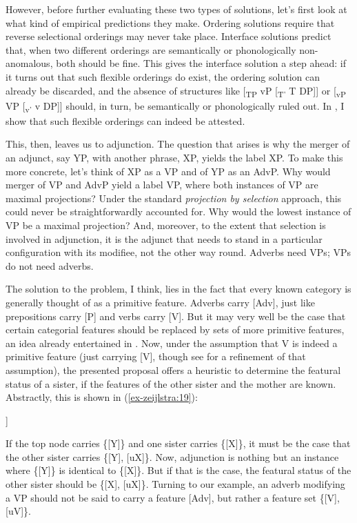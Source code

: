 \documentclass[output=paper
,modfonts
,nonflat]{langsci/langscibook}
\begin{document}
However, before further evaluating these two types of solutions, let’s first look at what kind of empirical predictions they make. Ordering solutions require that reverse selectional orderings may never take place. Interface solutions predict that, when two different orderings are semantically or phonologically non-anomalous, both should be fine. This gives the interface solution a step ahead: if it turns out that such flexible orderings do exist, the ordering solution can already be discarded, and the absence of structures like [\textsubscript{TP} vP [\textsubscript{T’} T DP]] or [\textsubscript{vP} VP [\textsubscript{v’} v DP]] should, in turn, be semantically or phonologically ruled out. In , I show that such flexible orderings can indeed be attested.

This, then, leaves us to adjunction. The question that arises is why the merger of an adjunct, say YP, with another phrase, XP, yields the label XP. To make this more concrete, let’s think of XP as a VP and of YP as an AdvP. Why would merger of VP and AdvP yield a label VP, where both instances of VP are maximal projections? Under the standard \textit{projection by selection} approach, this could never be straightforwardly accounted for. Why would the lowest instance of VP be a maximal projection? And, moreover, to the extent that selection is involved in adjunction, it is the adjunct that needs to stand in a particular configuration with its modifiee, not the other way round. Adverbs need VPs; VPs do not need adverbs. 

The solution to the problem, I think, lies in the fact that every known category is generally thought of as a primitive feature. Adverbs carry [Adv], just like prepositions carry [P] and verbs carry [V]. But it may very well be the case that certain categorial features should be replaced by sets of more primitive features, an idea already entertained in \citet{Chomsky1970, Chomsky1981}. Now, under the assumption that V is indeed a primitive feature (just carrying [V], though see  for a refinement of that assumption), the presented proposal offers a heuristic to determine the featural status of a sister, if the features of the other sister and the mother are known. Abstractly, this is shown in (\ref{ex-zeijlstra:19}): 

\begin{exe}
		\ex\label{ex-zeijlstra:19}
			\begin{forest}	
				[\{{[}Y{]}\}
				[\{{[}X{]}\}]
				[\{{[}Y{]}{,} {[}uX{]}\}] ]
		\end{forest}
	\end{exe}
\noindent If the top node carries \{[Y]\} and one sister carries \{[X]\}, it must be the case that the other sister carries \{[Y], [uX]\}. Now, adjunction is nothing but an instance where \{[Y]\} is identical to \{[X]\}. But if that is the case, the featural status of the other sister should be \{[X], [uX]\}. 
Turning to our example, an adverb modifying a VP should not be said to carry a feature [Adv], but rather a feature set \{[V], [uV]\}.
\end{document}
